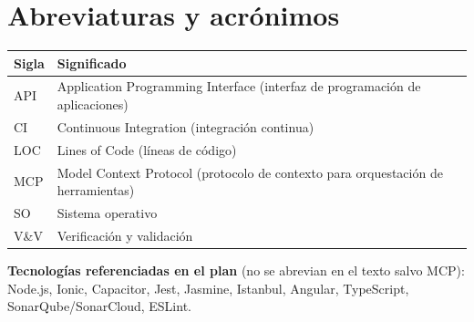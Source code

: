 \newpage
{}
{}
\section*{Abreviaturas y acrónimos}
\begin{tabular}{@{}p{2.2cm}p{11.5cm}@{}}
\toprule
\textbf{Sigla} & \textbf{Significado} \\
\midrule
API   & Application Programming Interface (interfaz de programación de aplicaciones) \\
CI    & Continuous Integration (integración continua) \\
LOC   & Lines of Code (líneas de código) \\
MCP   & Model Context Protocol (protocolo de contexto para orquestación de herramientas) \\
SO    & Sistema operativo \\
V\&V  & Verificación y validación \\
\bottomrule
\end{tabular}

\vspace{0.4cm}
\noindent\textbf{Tecnologías referenciadas en el plan} (no se abrevian en el texto salvo MCP): Node.js, Ionic, Capacitor, Jest, Jasmine, Istanbul, Angular, TypeScript, SonarQube/SonarCloud, ESLint.
